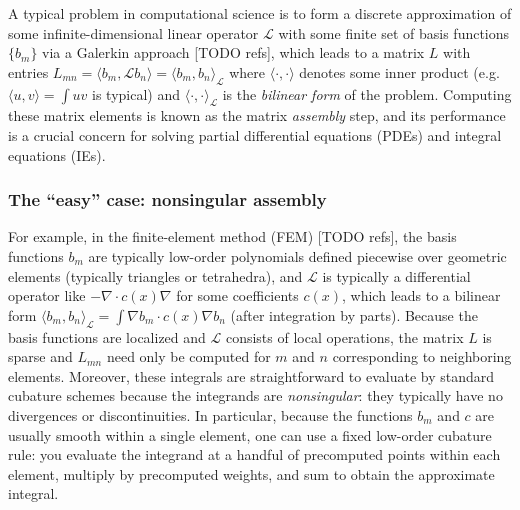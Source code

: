 A typical problem in computational science is to form a discrete approximation
of some infinite-dimensional linear operator $\mathcal{L}$ with some finite set of
basis functions $\{ b_m \}$ via a Galerkin approach [TODO refs], which leads to a
matrix $L$ with entries
$L_{mn} = \langle b_m, \mathcal{L} b_n \rangle = \langle b_m, b_n \rangle_\mathcal{L}$
where $\langle \cdot, \cdot \rangle$ denotes some inner product
(e.g. $\langle u, v \rangle = \int u v$ is typical) and
$\langle \cdot, \cdot \rangle_\mathcal{L}$ is the \emph{bilinear form} of the problem.
Computing these matrix elements is known as the matrix \emph{assembly} step, and its
performance is a crucial concern for solving partial differential equations (PDEs) and
integral equations (IEs).

\iffalse
\subsubsection{The ``easy'' case: nonsingular assembly}

For example, in the finite-element method (FEM) [TODO refs], the basis functions $b_m$
are typically low-order polynomials defined piecewise over geometric elements
(typically triangles or tetrahedra), and $\mathcal{L}$ is typically a differential
operator like $-\nabla \cdot c(x) \nabla$ for some coefficients $c(x)$, which leads to
a bilinear form
$\langle b_m, b_n \rangle_\mathcal{L} = \int \nabla b_m \cdot c(x) \nabla b_n$
(after integration by parts).
Because the basis functions are localized and $\mathcal{L}$ consists of local operations,
the matrix $L$ is sparse and $L_{mn}$ need only be computed for $m$ and $n$ corresponding
to neighboring elements.
Moreover, these integrals are straightforward to evaluate by standard cubature schemes
because the integrands are \emph{nonsingular}: they typically have no divergences or
discontinuities.
In particular, because the functions $b_m$ and $c$ are usually smooth within a single
element, one can use a fixed low-order cubature rule: you evaluate the integrand at a
handful of precomputed points within each element, multiply by precomputed weights, and
sum to obtain the approximate integral.


